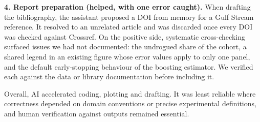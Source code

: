 \textbf{4. Report preparation (helped, with one error caught).} When drafting the bibliography, the assistant proposed a DOI from memory for a Gulf Stream reference. It resolved to an unrelated article and was discarded once every DOI was checked against Crossref. On the positive side, systematic cross-checking surfaced issues we had not documented: the undrogued share of the cohort, a shared legend in an existing figure whose error values apply to only one panel, and the default early-stopping behaviour of the boosting estimator. We verified each against the data or library documentation before including it.

Overall, AI accelerated coding, plotting and drafting. It was least reliable where correctness depended on domain conventions or precise experimental definitions, and human verification against outputs remained essential.
